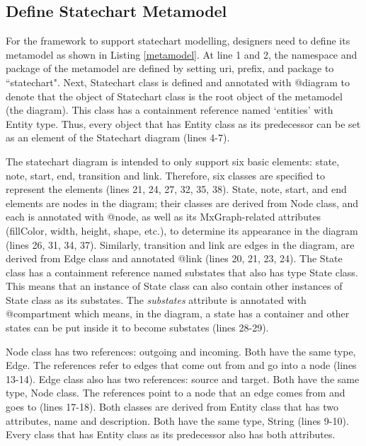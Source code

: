 \documentclass[conference]{IEEEtran}
\begin{document}
\subsection{Define Statechart Metamodel}
For the framework to support statechart modelling, designers need to define its metamodel as shown in Listing \ref{metamodel}. At line 1 and 2, the namespace and package of the metamodel are defined by setting uri, prefix, and package to ``statechart". Next, Statechart class is defined and annotated with {\selectfont @diagram} to denote that the object of Statechart class is the root object of the metamodel (the diagram). This class has a containment reference named `entities' with Entity type. Thus, every object that has Entity class as its predecessor can be set as an element of the Statechart diagram (lines 4-7).  

The statechart diagram is intended to only support six basic elements: state, note, start, end, transition and link. Therefore, six classes are specified to represent the elements (lines 21, 24, 27, 32, 35, 38). State, note, start, and end elements are nodes in the diagram; their classes are derived from Node class, and each is annotated with {\selectfont @node}, as well as its MxGraph-related attributes (fillColor, width, height, shape, etc.), to determine its appearance in the diagram (lines 26, 31, 34, 37). Similarly, transition and link are edges in the diagram, are derived from Edge class and annotated {\selectfont @link} (lines 20, 21, 23, 24). The State class has a containment reference named substates that also has type State class. This means that an instance of State class can also contain other instances of State class as its substates. The \emph{substates} attribute is annotated with {\selectfont @compartment} which means, in the diagram, a state has a container and other states can be put inside it to become substates (lines 28-29).

Node class has two references: outgoing and incoming. Both have the same type, Edge. The references refer to edges that come out from and go into a node (lines 13-14). Edge class also has two references: source and target. Both have the same type, Node class. The references point to a node that an edge comes from and goes to (lines 17-18). Both classes are derived from Entity class that has two attributes, name and description. Both have the same type, String (lines 9-10). Every class that has Entity class as its predecessor also has both attributes.        
\end{document}

